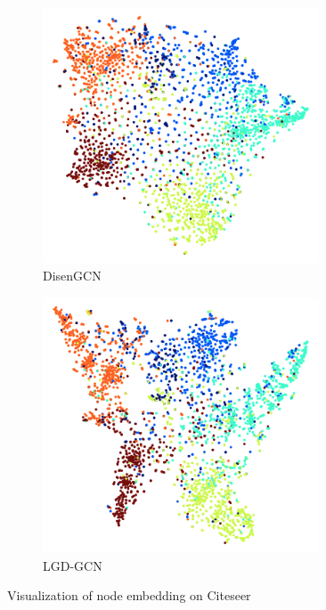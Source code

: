 \documentclass[accepted]{uai2021} %
\begin{document}
\begin{figure}[t]
    \centering
    \begin{subfigure}[b]{0.235\textwidth}
        \centering
        \includegraphics[width=0.9\textwidth]{disengcn_citevisual.png}
        \caption{\small{DisenGCN}}\label{fig:cite_disengcn}
    \end{subfigure}
    \hfill
    \begin{subfigure}[b]{0.235\textwidth}
        \centering
        \includegraphics[width=0.9\textwidth]{lgd_citevisual.png}
        \caption{\small{LGD-GCN}}\label{fig:cite_lgd}
    \end{subfigure}     
\caption{Visualization of node embedding on Citeseer}\label{fig:CiteVisual}
\end{figure}
\end{document}
